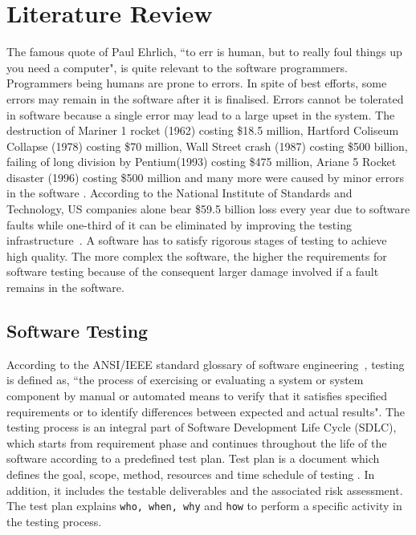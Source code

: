  
\chapter{Literature Review}
\label{chap:softwareTesting}
The famous quote of Paul Ehrlich, ``to err is human, but to really foul things up you need a computer", is quite relevant to the software programmers. Programmers being humans are prone to errors. In spite of best efforts, some errors may remain in the software after it is finalised.  Errors cannot be tolerated in software because a single error may lead to a large upset in the system. The destruction of Mariner 1 rocket (1962) costing \$18.5 million, Hartford Coliseum Collapse (1978) costing \$70 million, Wall Street crash (1987) costing \$500 billion, failing of long division by Pentium\texttrademark (1993) costing \$475 million, Ariane 5 Rocket disaster (1996) costing \$500 million and many more were caused by minor errors in the software \cite{garfinkel2005history}. According to the National Institute of Standards and Technology, US companies alone bear \$59.5 billion loss every year due to software faults while one-third of it can be eliminated by improving the testing infrastructure~\cite{tassey2002economic}. A software has to satisfy rigorous stages of testing to achieve high quality. The more complex the software, the higher the requirements for software testing because of the consequent larger damage involved if a fault remains in the software.

\section{Software Testing} \label{sec:softwareTesting}
According to the ANSI/IEEE standard glossary of software engineering~\cite{american1984}, testing is defined as, ``the process of exercising or evaluating a system or system component by manual or automated means to verify that it satisfies specified requirements or to identify differences between expected and actual results". The testing process is an integral part of Software Development Life Cycle (SDLC), which starts from requirement phase and continues throughout the life of the software according to a predefined test plan. Test plan is a document which defines the goal, scope, method, resources and time schedule of testing \cite{futrell2001quality}. In addition, it includes the testable deliverables and the associated risk assessment. The test plan explains \verb+who, when, why+ and \verb+how+ to perform a specific activity in the testing process. 

